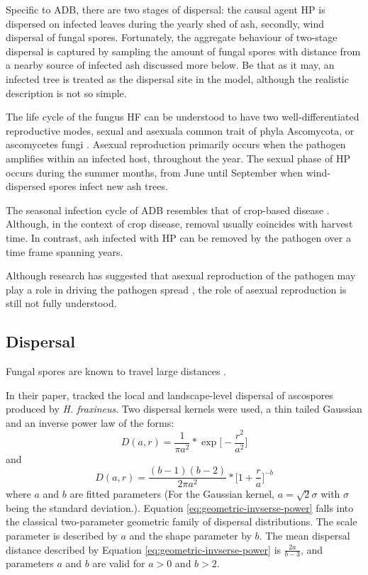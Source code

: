 Specific to ADB, there are two stages of dispersal: the causal agent HP is dispersed on infected leaves during the yearly shed of ash, secondly, wind dispersal of fungal spores. Fortunately, the aggregate behaviour of two-stage dispersal is captured by sampling the amount of fungal spores with distance from a nearby source of infected ash \cite{grosdidier2018tracking}\textemdash discussed more below. 
Be that as it may, an infected tree is treated as the dispersal site in the model, although the realistic description is not so simple.

The life cycle of the fungus HF can be understood to have two well-differentiated reproductive modes, sexual and asexual\textemdash a common trait of phyla Ascomycota, or ascomycetes fungi \cite{hawker2016physiology}.
Asexual reproduction primarily occurs when the pathogen amplifies within an infected host, throughout the year. 
The sexual phase of HP occurs during the summer months, from June until September when wind-dispersed spores infect new ash trees.

The seasonal infection cycle of ADB resembles that of crop-based disease \cite{tankam2020modelling}. Although, in the context of crop disease, removal usually coincides with harvest time. In contrast, ash infected with HP can be removed by the pathogen over a time frame spanning years.

Although research has suggested that asexual reproduction of the pathogen may play a role in driving the pathogen spread \cite{fones2016role}, 
the role of asexual reproduction is still not fully understood.

\subsection{Dispersal}

Fungal spores are known to travel large distances \cite{shaw2006assembling, mundt2009aerial, wingen2013long}.

In their paper, \cite{grosdidier2018tracking} tracked the local and landscape-level dispersal of ascospores produced by \textit{H. fraxineus}.
Two dispersal kernels were used, a thin tailed Gaussian and an inverse power law of the forms:
\begin{equation}
    D(a, r) = \frac{1}{\pi a^2} * \exp\big[-\frac{r^2}{a^2}\big]
    \label{eq:adb-ga}
\end{equation}
and
\begin{equation}
    D(a, r) = \frac{(b-1)(b-2)}{2\pi a^2} * \big[ 1+ \frac{r}{a}\big]^{-b}
    \label{eq:geometric-invserse-power-law}
\end{equation}
where $a$ and $b$ are fitted parameters (For the Gaussian kernel, $a=\sqrt{2}\sigma$ with $\sigma$ being the standard deviation.). Equation \ref{eq:geometric-invserse-power} falls into the classical two-parameter geometric family of dispersal distributions.
The scale parameter is described by $a$ and the shape parameter by $b$.
The mean dispersal distance described by Equation \ref{eq:geometric-invserse-power} is  $\frac{2a}{b-3}$, and parameters $a$ and $b$ are valid for $a>0$ and $b>2$.

